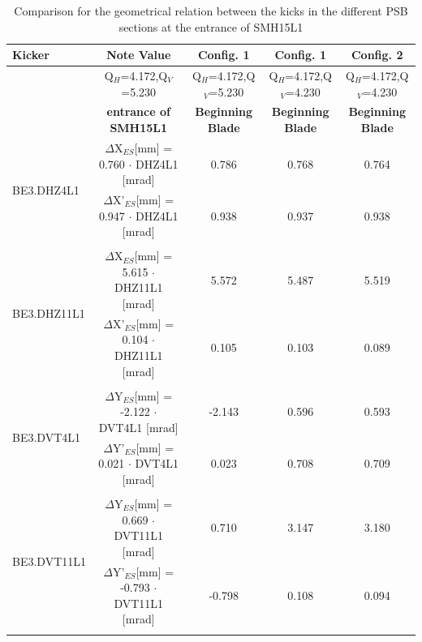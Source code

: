 \documentclass[11pt,letter,english]{article}
\begin{document}
\begin{table}

  \caption{
    Comparison for the geometrical relation between the kicks in the different PSB sections at the entrance of SMH15L1
    }

  \label{tab:geom_rel}

  \begin{tabular}{ |l|c|c|c|c| }\hline
  Kicker & Note Value               & Config. 1                & Config. 1                & Config. 2               \\ \hline
         & Q$_H$=4.172,Q$_V$=5.230  & Q$_H$=4.172,Q$_V$=5.230  & Q$_H$=4.172,Q$_V$=4.230  & Q$_H$=4.172,Q$_V$=4.230 \\ \hline
         & {\bf entrance of SMH15L1}             & {\bf Beginning Blade}                 & {\bf Beginning Blade}                 & {\bf Beginning Blade}                 \\ \hline

  \multirow{2}{*}{BE3.DHZ4L1} & $\Delta$X$_{ES}$[mm]  = 0.760 $\cdot$ DHZ4L1 [mrad] & 0.786 & 0.768 & 0.764 \\  \cline{2-5}
                              & $\Delta$X'$_{ES}$[mm] = 0.947 $\cdot$ DHZ4L1 [mrad] & 0.938 & 0.937 & 0.938 \\  \hline      
  \multicolumn{5}{|c|}{}        \\ \hline

  \multirow{2}{*}{BE3.DHZ11L1} & $\Delta$X$_{ES}$[mm]  = 5.615 $\cdot$ DHZ11L1 [mrad] & 5.572 & 5.487 & 5.519 \\ \cline{2-5} 
                               & $\Delta$X'$_{ES}$[mm] = 0.104 $\cdot$ DHZ11L1 [mrad] & 0.105 & 0.103 & 0.089 \\ \hline      
 \multicolumn{5}{|c|}{} \\ \hline

 \multirow{2}{*}{BE3.DVT4L1} & $\Delta$Y$_{ES}$[mm]  = -2.122 $\cdot$ DVT4L1 [mrad] & -2.143 & 0.596 & 0.593 \\  \cline{2-5}  
                             & $\Delta$Y'$_{ES}$[mm] =  0.021 $\cdot$ DVT4L1 [mrad] &  0.023 & 0.708 & 0.709 \\  \hline       
 \multicolumn{5}{|c|}{} \\ \hline

 \multirow{2}{*}{BE3.DVT11L1} & $\Delta$Y$_{ES}$[mm]  =  0.669 $\cdot$ DVT11L1 [mrad] &  0.710 & 3.147 & 3.180 \\ \cline{2-5}  
                              & $\Delta$Y'$_{ES}$[mm] = -0.793 $\cdot$ DVT11L1 [mrad] & -0.798 & 0.108 & 0.094 \\ \hline       
 \multicolumn{5}{|c|}{} \\ \hline

\end{tabular}
\end{table}
\end{document}
